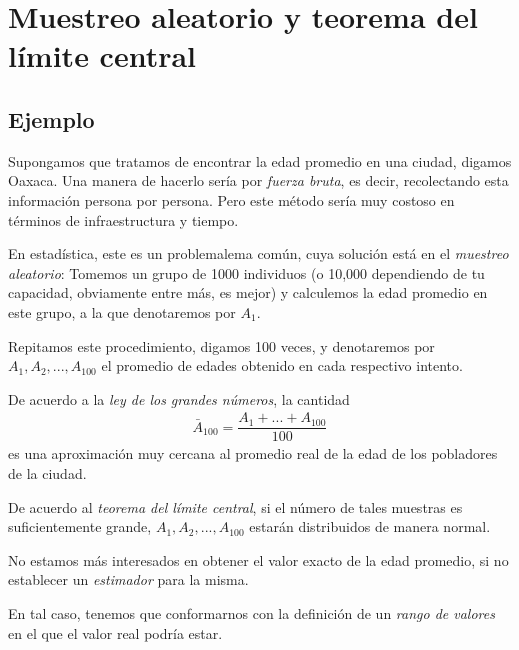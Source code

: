 \section{Muestreo aleatorio y teorema del límite central}

\subsection{Ejemplo}
Supongamos que tratamos de encontrar la edad promedio en una ciudad, digamos Oaxaca. Una manera de hacerlo sería por \emph{fuerza bruta}, es decir, recolectando esta información persona por persona. Pero este método sería muy costoso en términos de infraestructura y tiempo.


En estadística, este es un problemalema común, cuya solución está en el \emph{muestreo aleatorio}:  Tomemos un grupo de 1000 individuos (o 10,000 dependiendo de tu capacidad, obviamente entre más, es mejor) y calculemos la edad promedio en este grupo, a la que denotaremos por $A_{1}.$ 


Repitamos este procedimiento, digamos 100 veces, y denotaremos por $A_{1}, A_{2},...,A_{100}$ el promedio de edades obtenido en cada respectivo intento.

De acuerdo a la \emph{ley de los grandes números}, la cantidad
\begin{align}
	\bar{A}_{100}=\dfrac{A_{1}+...+A_{100}}{100}
\end{align}
es una aproximación muy cercana al promedio real de la edad de los pobladores de la ciudad.


De acuerdo al \emph{teorema del límite central}, si el número de tales muestras es suficientemente grande,
$A_{1},A_{2},...,A_{100}$ estarán distribuidos de manera normal.


\begin{observacion}
	No estamos más interesados en obtener el valor exacto de la edad promedio, si no establecer un \emph{estimador} para la misma. 
	
	En tal caso,
	tenemos que conformarnos con la definición de un \emph{rango de valores} en el que el valor real podría estar.
\end{observacion}


% 
% 
